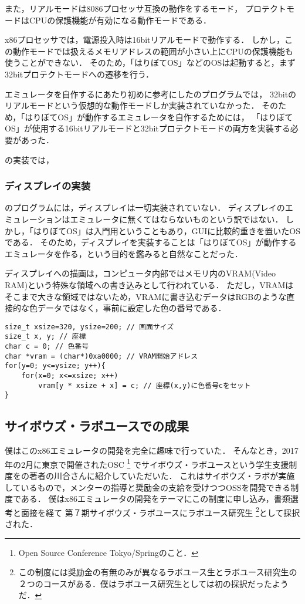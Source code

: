\documentclass[10pt,a4j]{jsarticle}
\begin{document}
また，リアルモードは8086プロセッサ互換の動作をするモード，
プロテクトモードはCPUの保護機能が有効になる動作モードである．

x86プロセッサでは，電源投入時は16bitリアルモードで動作する．
しかし，この動作モードでは扱えるメモリアドレスの範囲が小さい上にCPUの保護機能も使うことができない．
そのため，「はりぼてOS」などのOSは起動すると，まず32bitプロテクトモードへの遷移を行う．

エミュレータを自作するにあたり初めに参考にした\cite{learn-x86-by-emu}のプログラムでは，
32bitのリアルモードという仮想的な動作モードしか実装されていなかった．
そのため，「はりぼてOS」が動作するエミュレータを自作するためには，
「はりぼてOS」が使用する16bitリアルモードと32bitプロテクトモードの両方を実装する必要があった．

\cite{learn-x86-by-emu}の実装では，

\subsubsection{ディスプレイの実装}
\cite{learn-x86-by-emu}のプログラムには，ディスプレイは一切実装されていない．
ディスプレイのエミュレーションはエミュレータに無くてはならないものという訳ではない．
しかし，「はりぼてOS」は入門用ということもあり，GUIに比較的重きを置いたOSである．
そのため，ディスプレイを実装することは「はりぼてOS」が動作するエミュレータを作る，という目的を鑑みると自然なことだった．

ディスプレイへの描画は，コンピュータ内部ではメモリ内のVRAM(Video RAM)という特殊な領域への書き込みとして行われている．
ただし，VRAMはそこまで大きな領域ではないため，VRAMに書き込むデータはRGBのような直接的な色データではなく，事前に設定した色の番号である．

\begin{lstlisting}
size_t xsize=320, ysize=200; // 画面サイズ
size_t x, y; // 座標
char c = 0; // 色番号
char *vram = (char*)0xa0000; // VRAM開始アドレス
for(y=0; y<=ysize; y++){
	for(x=0; x<=xsize; x++)
		vram[y * xsize + x] = c; // 座標(x,y)に色番号cをセット
}
\end{lstlisting}


\subsection{サイボウズ・ラボユースでの成果}

僕はこのx86エミュレータの開発を完全に趣味で行っていた．
そんなとき，2017年の2月に東京で開催されたOSC
\footnote{Open Source Conference Tokyo/Springのこと．}
でサイボウズ・ラボユースという学生支援制度を\cite{30days-osdev}の著者の川合さんに紹介していただいた．
これはサイボウズ・ラボが実施しているもので，メンターの指導と奨励金の支給を受けつつOSSを開発できる制度である．
僕はx86エミュレータの開発をテーマにこの制度に申し込み，書類選考と面接を経て
第７期サイボウズ・ラボユースにラボユース研究生
\footnote{この制度には奨励金の有無のみが異なるラボユース生とラボユース研究生の２つのコースがある．僕はラボユース研究生としては初の採択だったようだ．}として採択された．
\end{document}
